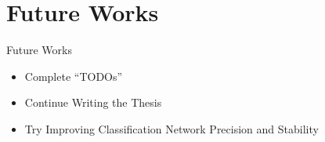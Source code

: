 \section{Future Works}
\begin{frame}{Future Works}
\begin{itemize}
    \item Complete ``TODOs''
    \item Continue Writing the Thesis
    \item Try Improving Classification Network Precision and Stability
\end{itemize}
\end{frame}